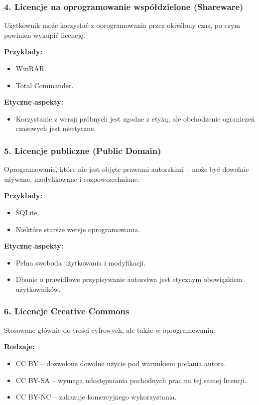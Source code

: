 \subsubsection{4. Licencje na oprogramowanie współdzielone (Shareware)}
Użytkownik może korzystać z oprogramowania przez określony czas, po czym powinien wykupić licencję.

\textbf{Przykłady:}
\begin{itemize}
    \item WinRAR.
    \item Total Commander.
\end{itemize}

\textbf{Etyczne aspekty:}
\begin{itemize}
    \item Korzystanie z wersji próbnych jest zgodne z etyką, ale obchodzenie ograniczeń czasowych jest nieetyczne.
\end{itemize}

\subsubsection{5. Licencje publiczne (Public Domain)}
Oprogramowanie, które nie jest objęte prawami autorskimi – może być dowolnie używane, modyfikowane i rozpowszechniane.

\textbf{Przykłady:}
\begin{itemize}
    \item SQLite.
    \item Niektóre starsze wersje oprogramowania.
\end{itemize}

\textbf{Etyczne aspekty:}
\begin{itemize}
    \item Pełna swoboda użytkowania i modyfikacji.
    \item Dbanie o prawidłowe przypisywanie autorstwa jest etycznym obowiązkiem użytkowników.
\end{itemize}

\subsubsection{6. Licencje Creative Commons}
Stosowane głównie do treści cyfrowych, ale także w oprogramowaniu.

\textbf{Rodzaje:}
\begin{itemize}
    \item CC BY – dozwolone dowolne użycie pod warunkiem podania autora.
    \item CC BY-SA – wymaga udostępniania pochodnych prac na tej samej licencji.
    \item CC BY-NC – zakazuje komercyjnego wykorzystania.
\end{itemize}

